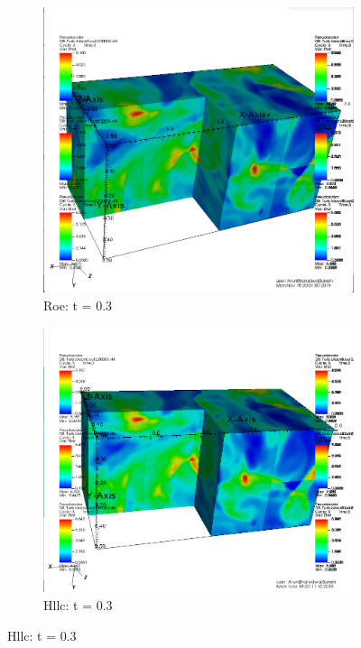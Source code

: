 \documentclass[12pt]{article}
\begin{document}
\begin{figure}[h]
	\centering
	\begin{subfigure}[h]{0.4500\textwidth}
		\centering
		\includegraphics[width=\textwidth]{roet3.png}
		\caption{Roe: t = 0.3}
	\end{subfigure}
	\begin{subfigure}[h]{0.4500\textwidth}
		\centering
		\includegraphics[width=\textwidth]{hllct3.png}
		\caption{Hllc: t = 0.3}
	\end{subfigure}
\end{figure}\\\\
\end{document}
